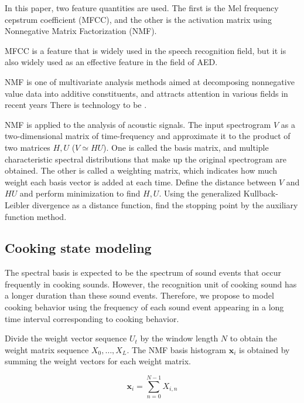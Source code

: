 \documentclass[sigconf,anonymous]{acmart}
\begin{document}
In this paper, two feature quantities are used. The first is the Mel frequency cepstrum coefficient (MFCC), and the other is the activation matrix using Nonnegative Matrix Factorization (NMF).

 MFCC is a feature that is widely used in the speech recognition field, but it is also widely used as an effective feature in the field of AED.

NMF is one of multivariate analysis methods aimed at decomposing nonnegative value data into additive constituents, and attracts attention in various fields in recent years There is technology to be \cite{Lee1999}.

NMF is applied to the analysis of acoustic signals. The input spectrogram $ V $ as a two-dimensional matrix of time-frequency and approximate it to the product of two matrices $ H, U $ ($ V \simeq HU $). One is called the basis matrix, and multiple characteristic spectral distributions that make up the original spectrogram are obtained. The other is called a weighting matrix, which indicates how much weight each basis vector is added at each time. Define the distance between $ V $ and $ HU $ and perform minimization to find $ H, U $.
Using the generalized Kullback-Leibler divergence as a distance function, find the stopping point by the auxiliary function method.

\subsection{Cooking state modeling}
The spectral basis is expected to be the spectrum of sound events that occur frequently in cooking sounds. However, the recognition unit of cooking sound has a longer duration than these sound events. Therefore, we propose to model cooking behavior using the frequency of each sound event appearing in a long time interval corresponding to cooking behavior.

Divide the weight vector sequence $ {U_t} $ by the window length $ N $ to obtain the weight matrix sequence $ X_0, \ldots, X_L $.
The NMF basis histogram $ \bm{x} _i $ is obtained by summing the weight vectors for each weight matrix.

\begin{equation}
\label{hist}
	\bm{x}_i = \sum_{n=0}^{N-1} X_{i, n}
\end{equation}
\end{document}

